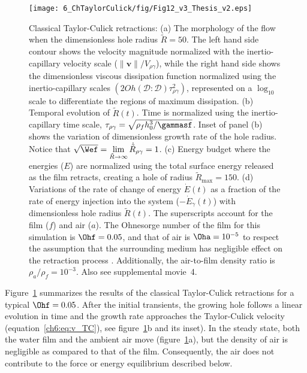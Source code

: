 \begin{subappendices}
	\begin{figure}
		\centering
		\texttt{[image: 6\_ChTaylorCulick/fig/Fig12\_v3\_Thesis\_v2.eps]}	
		\caption{Classical Taylor-Culick retractions: (a) The morphology of the flow when the dimensionless hole radius $\tilde{R} = 50$. The left hand side contour shows the velocity magnitude normalized with the inertio-capillary velocity scale ($\|\boldsymbol{v}\|/V_{\rho\gamma}$), while the right hand side shows the dimensionless viscous dissipation function normalized using the inertio-capillary scales $\left(2Oh\left(\boldsymbol{\mathcal{D}:\mathcal{D}}\right)\tau_{\rho\gamma}^2\right)$, represented on a $\log_{\text{10}}$ scale to differentiate the regions of maximum dissipation. (b) Temporal evolution of $\tilde{R}(t)$. Time is normalized using the inertio-capillary time scale, $\tau_{\rho\gamma} = \sqrt{\rho_f h_0^3/\gammasf}$. Inset of panel (b) shows the variation of dimensionless growth rate of the hole radius. Notice that $\sqrt{\Wef} = \lim\limits_{\tilde{R} \to \infty}\dot{\tilde{R}}_{\rho\gamma} = 1$. (c) Energy budget where the energies ($E$) are normalized using the total surface energy released as the film retracts, creating a hole of radius $\tilde{R}_{\text{max}} = 150$. (d) Variations of the rate of change of energy $\dot{E}(t)$ as a fraction of the rate of energy injection into the system ($-\dot{E}_\gamma (t)$) with dimensionless hole radius $\tilde{R}(t)$. The superscripts account for the film ($f$) and air ($a$). The Ohnesorge number of the film for this simulation is $\Ohf = 0.05$, and that of air is $\Oha = 10^{-5}$ to respect the assumption that the surrounding medium has negligible effect on the retraction process \citep{taylor-1959-procrsoclonda, culick-1960-japplphys}. Additionally, the air-to-film density ratio is $\rho_a/\rho_f = 10^{-3}$. Also see supplemental movie~{\color{Myfig}4}.}
		\label{fig:ClassicalTC}
	\end{figure}
	
	Figure~\ref{fig:ClassicalTC} summarizes the results of the classical Taylor-Culick retractions for a typical $\Ohf = 0.05$. After the initial transients, the growing hole follows a linear evolution in time and the growth rate approaches the Taylor-Culick velocity (equation~\eqref{ch6:eq:v_TC}), see figure~\ref{fig:ClassicalTC}b and its inset). In the steady state, both the water film and the ambient air move (figure~\ref{fig:ClassicalTC}a), but the density of air is negligible as compared to that of the film. Consequently, the air does not contribute to the force or energy equilibrium described below. 
	

\end{subappendices}
